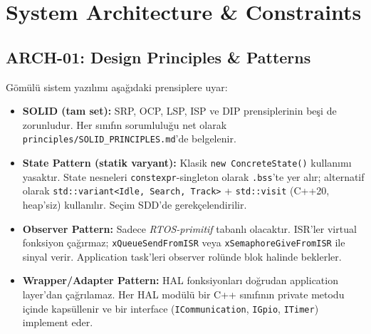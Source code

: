 \section{System Architecture \& Constraints}

\subsection{ARCH-01: Design Principles \& Patterns}
Gömülü sistem yazılımı aşağıdaki prensiplere uyar:
\begin{itemize}
    \item \textbf{SOLID (tam set):} SRP, OCP, LSP, ISP ve DIP prensiplerinin beşi de zorunludur. Her sınıfın sorumluluğu net olarak \texttt{principles/SOLID\_PRINCIPLES.md}'de belgelenir.
    \item \textbf{State Pattern (statik varyant):} Klasik \texttt{new ConcreteState()} kullanımı yasaktır. State nesneleri \texttt{constexpr}-singleton olarak \texttt{.bss}'te yer alır; alternatif olarak \texttt{std::variant<Idle, Search, Track>} + \texttt{std::visit} (C++20, heap'siz) kullanılır. Seçim SDD'de gerekçelendirilir.
    \item \textbf{Observer Pattern:} Sadece \textit{RTOS-primitif} tabanlı olacaktır. ISR'ler virtual fonksiyon çağırmaz; \texttt{xQueueSendFromISR} veya \texttt{xSemaphoreGiveFromISR} ile sinyal verir. Application task'leri observer rolünde blok halinde beklerler.
    \item \textbf{Wrapper/Adapter Pattern:} HAL fonksiyonları doğrudan application layer'dan çağrılamaz. Her HAL modülü bir C++ sınıfının private metodu içinde kapsüllenir ve bir interface (\texttt{ICommunication}, \texttt{IGpio}, \texttt{ITimer}) implement eder.
\end{itemize}


